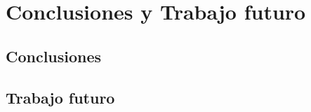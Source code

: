 \chapter{Conclusiones y Trabajo futuro}
\label{chap:conclusiones}

\section{Conclusiones}

\section{Trabajo futuro}
